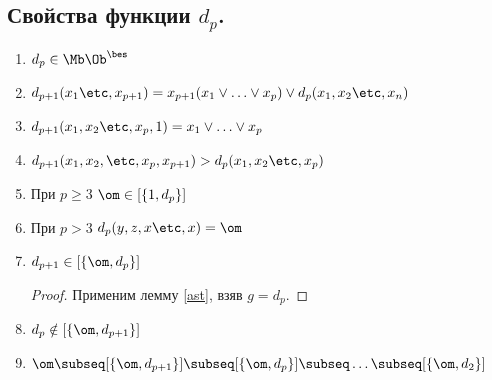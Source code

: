 \documentclass[unicode,10pt]{article}
\begin{document}
\subsection{Свойства функции $d_p$.}
\begin{enumerate}
  \item
    \begin{math}
      d_p \in \Mb\Oib
    \end{math}
  \item
    \begin{math}
      d_{p+1}(\seti[x]{1}{p+1}) =x_{p+1}(\svee[x]{1}{p})\vee d_p(\set[x]{n})
    \end{math}
  \item
    \begin{math}
      d_{p+1}(\set[x]{p},1) = \svee[x]{1}{p}
    \end{math}
  \item
    \begin{math}
      d_{p+1}(x_1, x_2,\etc, x_p, x_{p+1}) > d_p(x_1, x_2\etc, x_p)
    \end{math}
  \item
    \begin{lemma}
      При $p \ge 3$ $\om \in \cls{1, d_p}$
    \end{lemma}
  \item
    \begin{lemma}
      При $p>3$ $d_p(y,z,x\etc, x) = \om$ \WHY
    \end{lemma}
  \item
    \begin{lemma}
      $d_{p+1}\in \cls{\om, d_p}$
    \end{lemma}
    \begin{proof}
        Применим лемму \ref{ast}, взяв $g=d_p$. \THEN
    \end{proof}
  \item
    \begin{stm}
      \begin{math}
        d_p \notin \cls{\om, d_{p+1}}
      \end{math}
      \WHY
    \end{stm}
 \item
   \begin{math}
     \om \subseq \cls{\om,d_{p+1}} \subseq \cls{\om,d_p} \subseq\ldots\subseq\cls{\om,d_2}
   \end{math}
\end{enumerate}
\end{document}
